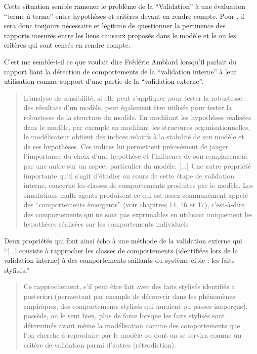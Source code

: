Cette situation semble ramener le problème de la \enquote{Validation} à une évaluation \enquote{terme à terme} entre hypothèses et critères devant en rendre compte. Pour \textcite{Bulle2005}, il sera donc toujours nécessaire et légitime de questionner la pertinence des rapports mesurés entre les liens causaux proposés dans le modèle et le ou les critères qui sont censés en rendre compte.


C’est me semble-t-il ce que voulait dire Frédéric Amblard \textcite{Amblard2006} lorsqu’il parlait du rapport liant la détection de comportements de la \enquote{validation interne} à leur utilisation comme support d’une partie de la \enquote{validation externe}.

\blockquote[\cite{Amblard2006}]{L'analyse de sensibilité, si elle peut s'appliquer pour tester la robustesse des résultats d'un modèle, peut également être utilisée pour tester la robustesse de la structure du modèle. En modifiant les hypothèses réalisées dans le modèle, par exemple en modifiant les structures organisationnelles, le modélisateur obtient des indices relatifs à la stabilité de son modèle et de ses hypothèses. Ces indices lui permettent précisément de jauger l'importance du choix d’une hypothèse et l’influence de son remplacement par une autre sur un aspect particulier du modèle. [...] Une autre propriété importante qu'il s'agit d'étudier au cours de cette étape de validation interne, concerne les classes de comportements produites par le modèle. Les simulations multi-agents produisent ce qui est assez communément appelé des \enquote{comportements émergents}  (voir chapitres 14, 16 et 17), c'est-à-dire des comportements qui ne sont pas exprimables en utilisant uniquement les hypothèses réalisées sur les comportements individuels}.

Deux propriétés qui font ainsi écho à une méthode de la validation externe qui \enquote{[...] consiste à rapprocher les classes de comportements (identifiées lors de la validation interne) à des comportements saillants du système-cible : les faits stylisés.}

\blockquote[\cite{Amblard2006}]{Ce rapprochement, s’il peut être fait avec des faits stylisés identifiés a posteriori (permettant par exemple de découvrir dans les phénomènes empiriques, des comportements stylisés qui auraient pu passer inaperçus), possède, on le sent bien, plus de force lorsque les faits stylisés sont déterminés avant même la modélisation comme des comportements que l'on cherche à reproduire par le modèle ou dont on se servira comme un critère de validation parmi d'autres (rétrodiction).}

